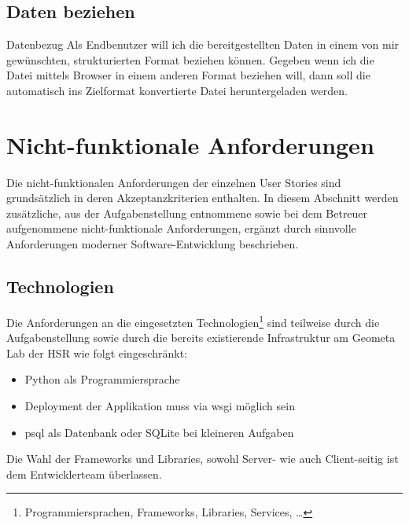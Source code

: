 \subsection{Daten beziehen}

\begin{scrumepic}[label=epic:pd:datenbezug]{Datenbezug}
	Als Endbenutzer will ich die bereitgestellten Daten in einem von mir gewünschten, strukturierten Format beziehen können.
	\storyacceptance	
	Gegeben
	wenn ich die Datei mittels Browser in einem anderen Format beziehen will, dann soll die automatisch ins Zielformat konvertierte Datei heruntergeladen werden.
\end{scrumepic}



\section{Nicht-funktionale Anforderungen}

Die nicht-funktionalen Anforderungen der einzelnen User Stories sind grundsätzlich in deren Akzeptanzkriterien enthalten.
In diesem Abschnitt werden zusätzliche, aus der Aufgabenstellung entnommene sowie bei dem Betreuer aufgenommene nicht-funktionale Anforderungen, ergänzt durch sinnvolle Anforderungen moderner Software-Entwicklung beschrieben.

\subsection{Technologien}
Die Anforderungen an die eingesetzten Technologien\footnote{Programmiersprachen, Frameworks, Libraries, Services, \dots} sind teilweise durch die Aufgabenstellung sowie durch die bereits existierende Infrastruktur am Geometa Lab der HSR wie folgt eingeschränkt:

\begin{itemize}
	\item Python als Programmiersprache
	\item Deployment der Applikation muss via \gls{wsgi} möglich sein
	\item \gls{psql} als Datenbank oder SQLite bei kleineren Aufgaben
\end{itemize}


Die Wahl der Frameworks und Libraries, sowohl Server- wie auch Client-seitig ist dem Entwicklerteam überlassen.

